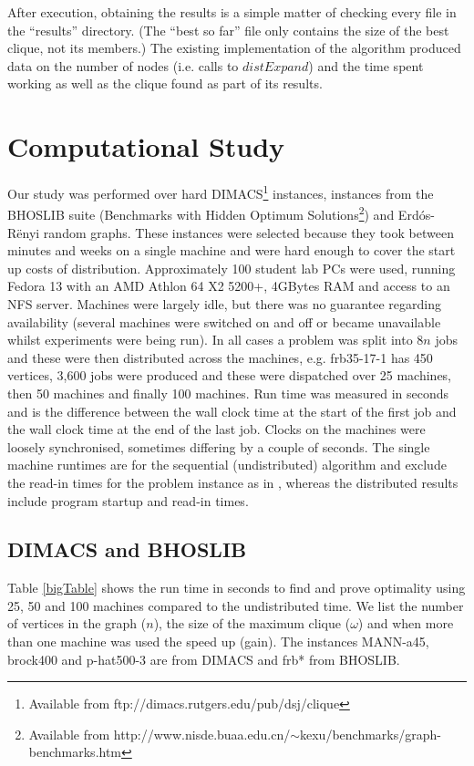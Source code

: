 \documentclass{l4proj}
\begin{document}
After execution, obtaining the results is a simple matter of checking every
file in the ``results'' directory. (The ``best so far'' file only contains the
size of the best clique, not its members.) The existing implementation of the
algorithm produced data on the number of nodes (i.e. calls to $distExpand$) and the time spent working as
well as the clique found as part of its results.

%
\chapter{Computational Study}
\label{sec:study}
\vspace{-1.5mm}
Our study was performed over hard DIMACS\footnote{Available from ftp://dimacs.rutgers.edu/pub/dsj/clique} instances,
instances from the BHOSLIB suite 
(Benchmarks with Hidden Optimum Solutions\footnote{Available from http://www.nisde.buaa.edu.cn/$\sim$kexu/benchmarks/graph-benchmarks.htm})
and Erd\'{o}s-R\"{e}nyi random graphs.
These instances were selected because they took between minutes and weeks on a single machine and were hard enough to cover the start up
costs of distribution. Approximately 100 student lab PCs were used, running Fedora 13 with an AMD Athlon 64 X2
5200+, 4GBytes RAM and access to an NFS server. Machines were 
largely idle, but there was no guarantee regarding availability (several
machines were switched on and off or became unavailable whilst experiments were being run).
In all cases a problem was split into $8n$ jobs and these were then distributed across the machines, e.g.
frb35-17-1 has 450 vertices, 3,600 jobs were produced and these were dispatched over 25 machines, then 50 machines and finally 100 machines.
Run time was measured in seconds and is the difference between 
the wall clock time at the start of the first job and the wall clock time at the end of the last job. Clocks on the machines
were loosely synchronised, sometimes differing by a couple of seconds. The single machine runtimes are for the sequential (undistributed) 
algorithm and exclude the read-in times for the problem instance as in \cite{tr-2012-333}, whereas the distributed results include 
program startup and read-in times.

\section{DIMACS and BHOSLIB}
Table \ref{bigTable} shows the run time in seconds to find and prove optimality
using 25, 50 and 100 machines compared to the undistributed time. 
We list the number of vertices in the graph ($n$), the size of the maximum clique ($\omega$) 
and when more than one machine was
used the speed up (gain). The instances MANN-a45, brock400 and
p-hat500-3 are from DIMACS and frb* from BHOSLIB.
\end{document}
